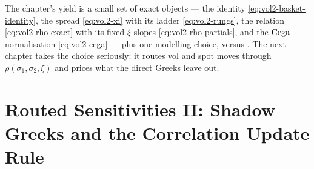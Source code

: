 \begin{table}[htbp]
\caption{The anchor example, carried forward. Chapters~2 and~3 reuse these
numbers on the stated bases: the routed-sensitivities chapter builds
$\shvega$ and $\shdelta$ from
$\pd{V}{\rho} = 100\,\Cega = 20$ and the channel slope $+2.321$ --- the
correlation mark and the map, the only rows the thread consumes; its
declared book carries the mark through the correlation channel alone. The
$\VB$ row is the basket-only translation of Section~\ref{sec:vol2-cega},
an illustration Chapters~2--3 do not consume. The exchange-option
chapter prices the spread book at $\SigmaM = 20\%$ against the same
correlation mark, but computes that book's own $\pd{V}{\rho}$ through the
$\SigmaM$ channel of \eqref{eq:vol2-dV-drho-full}; it must not consume the
basket book's $20$.}
\label{tab:vol2-anchor}
\end{table}

The chapter's yield is a small set of exact objects --- the identity
\eqref{eq:vol2-basket-identity}, the spread \eqref{eq:vol2-xi} with its
ladder \eqref{eq:vol2-rungs}, the relation \eqref{eq:vol2-rho-exact} with
its fixed-$\xi$ slopes \eqref{eq:vol2-rho-partials}, and the $\mathrm{Cega}$
normalisation \eqref{eq:vol2-cega} --- plus one modelling choice,
\stickyrho{} versus \stickycvc. The next chapter takes the choice
seriously: it routes vol and spot moves through
$\rho(\sigma_1, \sigma_2, \xi)$ and prices what the direct Greeks leave
out.

\providecommand{\Cegagap}{\Cega_{\mathrm{gap}}}

\chapter{Routed Sensitivities II: Shadow Greeks and the Correlation Update Rule}
\label{ch:sh2}

